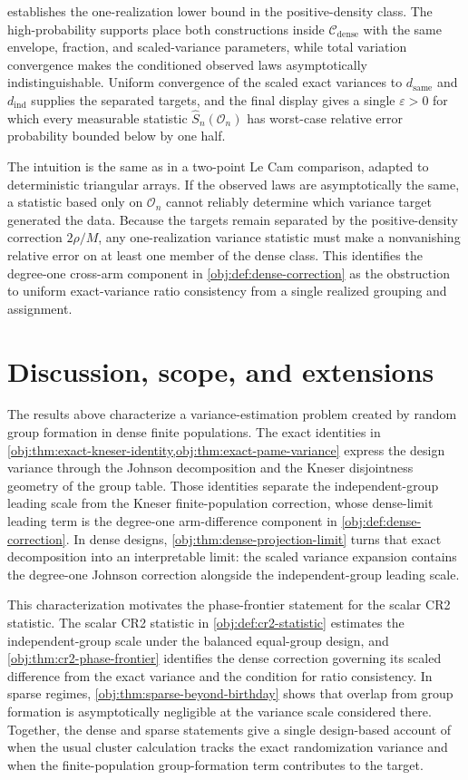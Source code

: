 \documentclass[11pt]{article}
\begin{document}
 establishes the one-realization lower bound in the positive-density class. The high-probability supports place both constructions inside \(\mathcal C_{\mathrm{dense}}\) with the same envelope, fraction, and scaled-variance parameters, while total variation convergence makes the conditioned observed laws asymptotically indistinguishable. Uniform convergence of the scaled exact variances to \(d_{\mathrm{same}}\) and \(d_{\mathrm{ind}}\) supplies the separated targets, and the final display gives a single \(\varepsilon>0\) for which every measurable statistic \(\widehat S_n(\mathcal O_n)\) has worst-case relative error probability bounded below by one half.

The intuition is the same as in a two-point Le Cam comparison, adapted to deterministic triangular arrays. If the observed laws are asymptotically the same, a statistic based only on \(\mathcal O_n\) cannot reliably determine which variance target generated the data. Because the targets remain separated by the positive-density correction \(2\rho/M\), any one-realization variance statistic must make a nonvanishing relative error on at least one member of the dense class. This identifies the degree-one cross-arm component in \cref{obj:def:dense-correction} as the obstruction to uniform exact-variance ratio consistency from a single realized grouping and assignment.


\section{Discussion, scope, and extensions}\label{sec:discussion}

The results above characterize a variance-estimation problem created by random group formation in dense finite populations. The exact identities in \cref{obj:thm:exact-kneser-identity,obj:thm:exact-pame-variance} express the design variance through the Johnson decomposition and the Kneser disjointness geometry of the group table. Those identities separate the independent-group leading scale from the Kneser finite-population correction, whose dense-limit leading term is the degree-one arm-difference component in \cref{obj:def:dense-correction}. In dense designs, \cref{obj:thm:dense-projection-limit} turns that exact decomposition into an interpretable limit: the scaled variance expansion contains the degree-one Johnson correction alongside the independent-group leading scale.

This characterization motivates the phase-frontier statement for the scalar CR2 statistic. The scalar CR2 statistic in \cref{obj:def:cr2-statistic} estimates the independent-group scale under the balanced equal-group design, and \cref{obj:thm:cr2-phase-frontier} identifies the dense correction governing its scaled difference from the exact variance and the condition for ratio consistency. In sparse regimes, \cref{obj:thm:sparse-beyond-birthday} shows that overlap from group formation is asymptotically negligible at the variance scale considered there. Together, the dense and sparse statements give a single design-based account of when the usual cluster calculation tracks the exact randomization variance and when the finite-population group-formation term contributes to the target.
\end{document}
